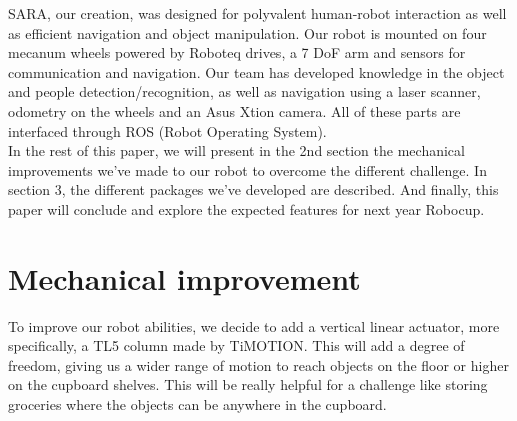 \documentclass[runningheads,a4paper]{llncs}
\begin{document}
SARA, our creation, was designed for polyvalent human-robot interaction as well as efficient navigation and object manipulation. Our robot is mounted on four mecanum wheels powered by Roboteq drives, a 7 DoF arm and sensors for communication and navigation. Our team has developed knowledge in the object and people detection/recognition, as well as navigation using a laser scanner, odometry on the wheels and an Asus Xtion camera. All of these parts are interfaced through ROS (Robot Operating System). \\

In the rest of this paper, we will present in the 2nd section the mechanical improvements we've made to our robot to overcome the different challenge. In section 3, the different packages we've developed are described. And finally, this paper will conclude and explore the expected features for next year Robocup.


\section{Mechanical improvement}

\tab To improve our robot abilities, we decide to add a vertical linear actuator, more specifically, a TL5 column made by TiMOTION. This will add a degree of freedom, giving us a wider range of motion to reach objects on the floor or higher on the cupboard shelves. This will be really helpful for a challenge like storing groceries where the objects can be anywhere in the cupboard. \\
\end{document}
